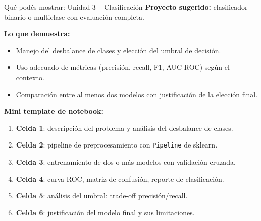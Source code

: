 \documentclass[aspectratio=169]{beamer}
\begin{document}
\begin{frame}{Qué podés mostrar: Unidad 3 -- Clasificación}
  \textbf{Proyecto sugerido:} clasificador binario o multiclase con evaluación completa.

  \bigskip
  \textbf{Lo que demuestra:}
  \begin{itemize}
    \item Manejo del desbalance de clases y elección del umbral de decisión.
    \item Uso adecuado de métricas (precisión, recall, F1, AUC-ROC) según el contexto.
    \item Comparación entre al menos dos modelos con justificación de la elección final.
  \end{itemize}

  \bigskip
  \textbf{Mini template de notebook:}
  \begin{enumerate}
    \item \textbf{Celda 1}: descripción del problema y análisis del desbalance de clases.
    \item \textbf{Celda 2}: pipeline de preprocesamiento con \texttt{Pipeline} de sklearn.
    \item \textbf{Celda 3}: entrenamiento de dos o más modelos con validación cruzada.
    \item \textbf{Celda 4}: curva ROC, matriz de confusión, reporte de clasificación.
    \item \textbf{Celda 5}: análisis del umbral: trade-off precisión/recall.
    \item \textbf{Celda 6}: justificación del modelo final y sus limitaciones.
  \end{enumerate}
\end{frame}
\end{document}
